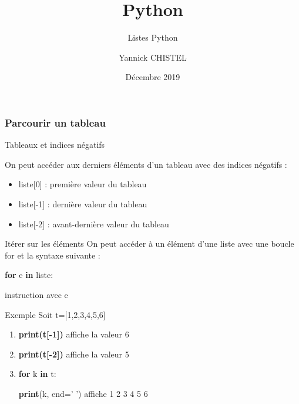\documentclass[9pt]{beamer}
\title{Python}
\subtitle{Listes Python}
\author{Yannick CHISTEL}
\institute{Lycée Dumont d'Urville - CAEN}
\date{Décembre 2019}
\newcounter{num}
\begin{document}
 
\frame{\titlepage}

\begin{frame}
\frametitle{Parcourir un tableau}

\begin{block}{Tableaux et indices négatifs}

On peut accéder aux derniers éléments d'un tableau avec des indices négatifs :
\begin{itemize}
\item liste[0] : première valeur du tableau
\item liste[-1] : dernière valeur du tableau
\item liste[-2] : avant-dernière valeur du tableau
\end{itemize}

\end{block}

\begin{block}{Itérer sur les éléments}
On peut accéder à un élément d'une liste avec une boucle for et la syntaxe suivante :

\textbf{for} e \textbf{in} liste:

\hspace{0.5cm}instruction avec e

\end{block}

\begin{exampleblock}{Exemple}
Soit t=[1,2,3,4,5,6]
\begin{enumerate}
\item \textbf{print(t[-1])} affiche la valeur 6
\item \textbf{print(t[-2])} affiche la valeur 5
\item \textbf{for} k \textbf{in} t:

\hspace{0.5cm}\textbf{print}(k, end=' ') affiche 1 2 3 4 5 6
\end{enumerate}

\end{exampleblock}

\end{frame}
\end{document}
